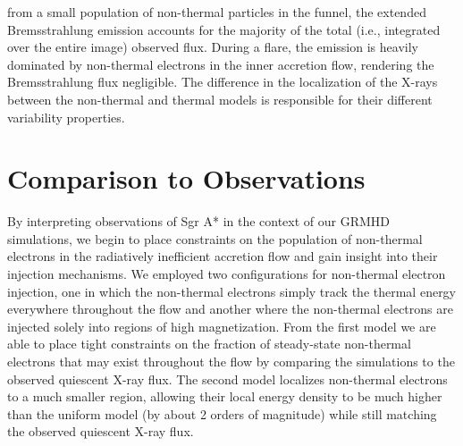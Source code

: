 from a small population of non-thermal particles in the
funnel, the extended Bremsstrahlung emission accounts
for the majority of the total (i.e., integrated over the entire image) observed flux. During a flare, the emission is
heavily dominated by non-thermal electrons in the inner
accretion flow, rendering the Bremsstrahlung flux negligible. The difference in the localization of the X-rays
between the non-thermal and thermal models is responsible for their different variability properties.

\section{Comparison to Observations}
By interpreting observations of Sgr A* in the context of our GRMHD simulations, we begin to place constraints on the population of non-thermal electrons in the radiatively inefficient accretion flow and gain insight into their injection mechanisms. We employed two configurations for non-thermal electron injection, one in which the non-thermal electrons simply track the thermal energy everywhere throughout the flow and another where the non-thermal electrons are injected solely into regions of high magnetization. From the first model we are able to place tight constraints on the fraction of steady-state non-thermal electrons that may exist throughout the flow by comparing the simulations to the observed quiescent X-ray flux. The second model localizes non-thermal electrons to a much smaller region, allowing their local energy density to be much higher than the uniform model (by about 2 orders of magnitude) while still matching the
observed quiescent X-ray flux.


